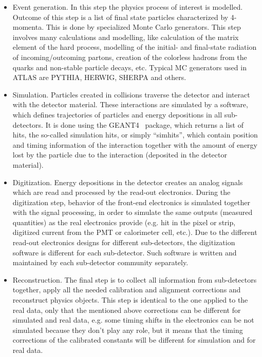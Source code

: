 \begin{itemize}
 \item Event generation. In this step the physics process of interest is modelled. Outcome of this step is a list of final state particles characterized by 4-momenta. 
This is done by specialized Monte Carlo generators. 
This step involves many calculations and modelling, like calculation of the matrix element of the hard process, modelling of the initial- and final-state radiation of incoming/outcoming partons,
creation of the colorless hadrons from the quarks and non-stable particle decays, etc. 
Typical MC generators used in ATLAS
 are PYTHIA, HERWIG, SHERPA and others.
 \item Simulation. Particles created in collisions traverse the detector and interact with the detector material. These interactions are simulated by a software, which defines trajectories of particles and energy depositions in all sub-detectors. 
 It is done using the GEANT4~\cite{Agostinelli:2002hh} package, which returns a list of hits, the so-called simulation hits, or simply ``simhits'', which contain position and timing information of 
 the interaction together with the amount of energy lost by the particle due to the interaction (deposited in the detector material).
 \item Digitization. Energy depositions in the detector creates an analog signals which are read and processed by the read-out electronics. During the digitization step, behavior of the front-end electronics is simulated together with the signal processing, in order to simulate the same outputs (measured quantities) as the real electronics provide (e.g. hit in the pixel or strip,
 digitized current from the PMT or calorimeter cell, etc.). Due to the different read-out electronics designs for different sub-detectors, the digitization software is different for each sub-detector.
 Such software is written and maintained by each sub-detector community separately.
 \item Reconstruction. The final step is to collect all information from sub-detectors together, apply all the needed calibration and alignment corrections and reconstruct physics objects. This step is identical to the one applied to the real data, only that the mentioned above corrections can be different for simulated and real 
 data, e.g. some timing shifts in the electronics can be not simulated because they don't play any role, but it means that the timing corrections of the calibrated constants will be different for simulation and for real data.
\end{itemize}

